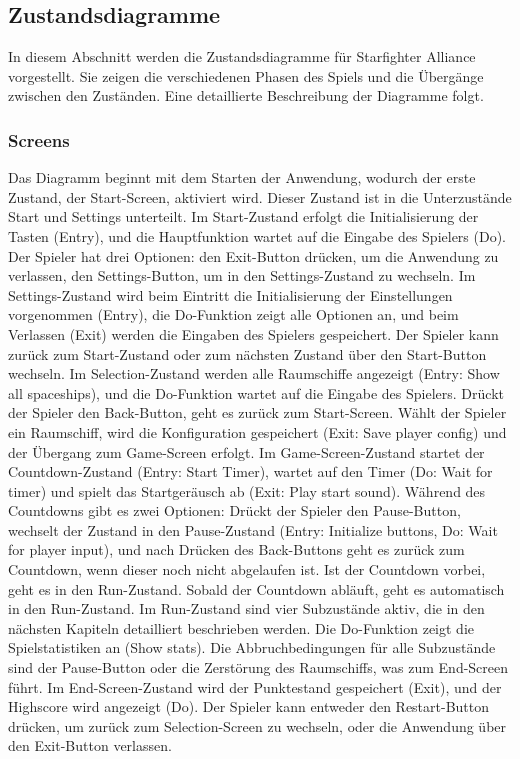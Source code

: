 \documentclass[10pt]{article}
\begin{document}
    	\subsection{Zustandsdiagramme}
    	In diesem Abschnitt werden die Zustandsdiagramme für Starfighter Alliance vorgestellt. Sie zeigen die verschiedenen Phasen des Spiels und die Übergänge zwischen den Zuständen. Eine detaillierte Beschreibung der Diagramme folgt.

\subsubsection{Screens}    	
Das Diagramm beginnt mit dem Starten der Anwendung, wodurch der erste Zustand, der Start-Screen, aktiviert wird. Dieser Zustand ist in die Unterzustände Start und Settings unterteilt. Im Start-Zustand erfolgt die Initialisierung der Tasten (Entry), und die Hauptfunktion wartet auf die Eingabe des Spielers (Do). Der Spieler hat drei Optionen: den Exit-Button drücken, um die Anwendung zu verlassen, den Settings-Button, um in den Settings-Zustand zu wechseln.
Im Settings-Zustand wird beim Eintritt die Initialisierung der Einstellungen vorgenommen (Entry), die Do-Funktion zeigt alle Optionen an, und beim Verlassen (Exit) werden die Eingaben des Spielers gespeichert. Der Spieler kann zurück zum Start-Zustand oder zum nächsten Zustand über den Start-Button wechseln.
Im Selection-Zustand werden alle Raumschiffe angezeigt (Entry: Show all spaceships), und die Do-Funktion wartet auf die Eingabe des Spielers. Drückt der Spieler den Back-Button, geht es zurück zum Start-Screen. Wählt der Spieler ein Raumschiff, wird die Konfiguration gespeichert (Exit: Save player config) und der Übergang zum Game-Screen erfolgt.
Im Game-Screen-Zustand startet der Countdown-Zustand (Entry: Start Timer), wartet auf den Timer (Do: Wait for timer) und spielt das Startgeräusch ab (Exit: Play start sound). Während des Countdowns gibt es zwei Optionen: Drückt der Spieler den Pause-Button, wechselt der Zustand in den Pause-Zustand (Entry: Initialize buttons, Do: Wait for player input), und nach Drücken des Back-Buttons geht es zurück zum Countdown, wenn dieser noch nicht abgelaufen ist. Ist der Countdown vorbei, geht es in den Run-Zustand. Sobald der Countdown abläuft, geht es automatisch in den Run-Zustand.
Im Run-Zustand sind vier Subzustände aktiv, die in den nächsten Kapiteln detailliert beschrieben werden. Die Do-Funktion zeigt die Spielstatistiken an (Show stats). Die Abbruchbedingungen für alle Subzustände sind der Pause-Button oder die Zerstörung des Raumschiffs, was zum End-Screen führt. Im End-Screen-Zustand wird der Punktestand gespeichert (Exit), und der Highscore wird angezeigt (Do). Der Spieler kann entweder den Restart-Button drücken, um zurück zum Selection-Screen zu wechseln, oder die Anwendung über den Exit-Button verlassen.\\
\end{document}
